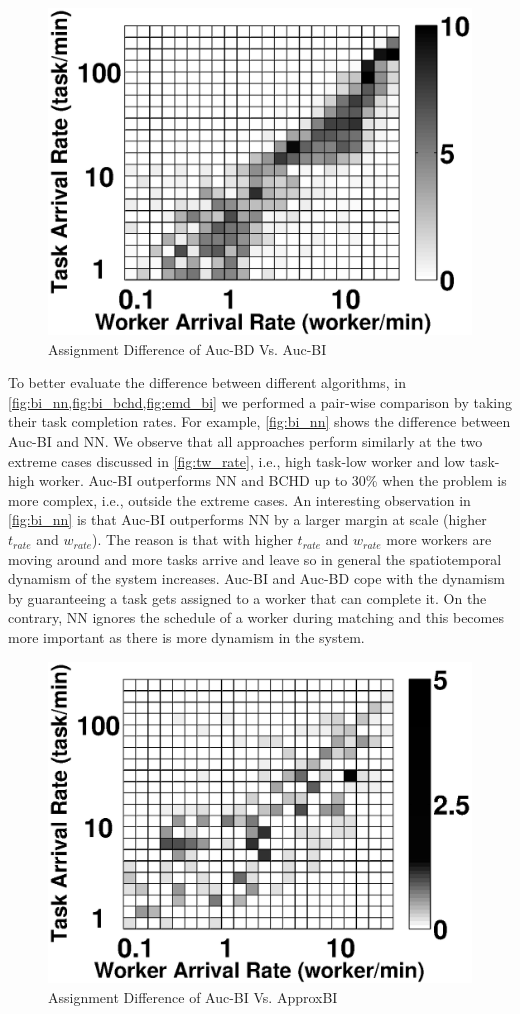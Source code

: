 \begin{figure}[h]
	\centering
	\includegraphics[width = 0.65\columnwidth]{figures/emd_bi.eps}
	\vspace{-0.1in}
	\caption{Assignment Difference of Auc-BD Vs. Auc-BI}\label{fig:emd_bi}
\end{figure}

To better evaluate the difference between different algorithms, in \cref{fig:bi_nn,fig:bi_bchd,fig:emd_bi} we performed a pair-wise comparison by taking their task completion rates. For example, \cref{fig:bi_nn} shows the difference between Auc-BI and NN. We observe that all approaches perform similarly at the two extreme cases discussed in \cref{fig:tw_rate}, i.e., high task-low worker and low task-high worker. Auc-BI outperforms NN and BCHD up to 30\% when the problem is more complex, i.e., outside the extreme cases. An interesting observation in \cref{fig:bi_nn} is that Auc-BI outperforms NN by a larger margin at scale (higher $t_{rate}$ and $w_{rate}$). The reason is that with higher $t_{rate}$ and $w_{rate}$ more workers are moving around and more tasks arrive and leave so in general the spatiotemporal dynamism of the system increases. Auc-BI and Auc-BD cope with the dynamism by guaranteeing a task gets assigned to a worker that can complete it. On the contrary, NN ignores the schedule of a worker during matching and this becomes more important as there is more dynamism in the system.\\

\begin{figure}[h]
	\centering
	\includegraphics[width = 0.75\columnwidth]{figures/bi_abi.eps}
	\vspace{-0.1in}
	\caption{Assignment Difference of Auc-BI Vs. ApproxBI}\label{fig:bi_abi}
\end{figure}

